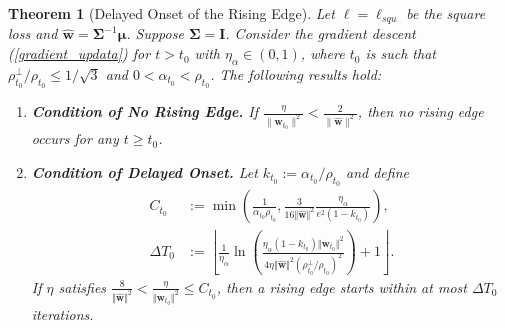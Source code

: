 \documentclass[pdflatex,sn-basic]{sn-jnl}%
\theoremstyle{thmstyleone}%
\newtheorem{theorem}{Theorem}%
\begin{document}


\begin{theorem}[Delayed Onset of the Rising Edge]\label{Occurance_of_Spike_ls}
  Let $\ell = \ell_{squ}$ be the square loss and $\hat{\mathbf{w}} = \mathbf{\Sigma}^{-1} \boldsymbol{\mu}$. Suppose $\mathbf{\Sigma} = \mathbf{I}$. 
  Consider the gradient descent (\ref{gradient_updata}) 
  for $t > t_0$ with $\eta_{\alpha} \in (0, 1)$, where $t_0$ is such that 
  $\rho_{t_0}^{\perp} / \rho_{t_0} \le 1/\sqrt{3}$ and $0 < \alpha_{t_0} < \rho_{t_0}$. The following results hold:
  \begin{enumerate}
    \item \textbf{Condition of No Rising Edge.} 
    If $\frac{\eta}{\| \mathbf{w}_{t_0} \|^2} < \frac{2}{\| \hat{\mathbf{w}} \|^2}$, then no rising edge occurs for any $t \ge t_0$.
    \item \textbf{Condition of Delayed Onset.}
    Let $k_{t_0} := \alpha_{t_0}/\rho_{t_0}$ and define
    \begin{equation*}
    \begin{aligned}
      C_{t_0} & :=
      \min \left(
        \frac{1}{\alpha_{t_0} \rho_{t_0}},
        \frac{3}{16\Vert \hat{\mathbf{w}} \Vert^2}
        \frac{\eta_\alpha}{e^{2} \left( 1 - k_{t_0} \right)}
      \right), \\
      \Delta T_0 & :=
      \left\lfloor
        \frac{1}{\eta_\alpha}
        \ln
        \left(
          \frac{\eta_\alpha \left(1-k_{t_0}\right)\Vert \mathbf{w}_{t_0}\Vert^2}{
            4 \eta \Vert \hat{\mathbf{w}} \Vert^2 \left(\rho_{t_0}^{\perp}/\rho_{t_0}\right)^2
          }
        \right)
        + 1
      \right\rfloor.
    \end{aligned}
    \end{equation*}
    If $\eta$ satisfies $\frac{8 }{\Vert \hat{\mathbf{w}} \Vert^2} 
        < 
        \frac{\eta}{\Vert \mathbf{w}_{t_0} \Vert^{2}} 
        \le 
        C_{t_0}$, then a rising edge starts within at most $\Delta T_0$ iterations.  

\end{enumerate}
\end{theorem}
\end{document}

